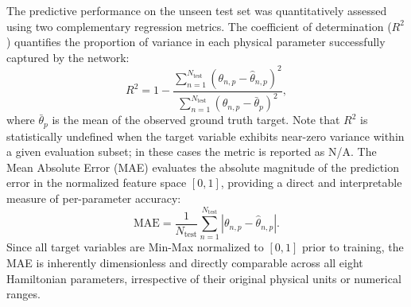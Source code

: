 \documentclass[a4paper,fleqn]{cas-sc}
\begin{document}
The predictive performance on the unseen test set 
was quantitatively assessed using two complementary 
regression metrics. The coefficient of determination 
($R^2$) quantifies the proportion of variance in 
each physical parameter successfully captured by 
the network:
%
\begin{equation}\label{eq:R2}
R^2 = 1 - \frac{\sum_{n=1}^{N_{\text{test}}} 
\left(\theta_{n,p} - \hat{\theta}_{n,p}\right)^2}
{\sum_{n=1}^{N_{\text{test}}} 
\left(\theta_{n,p} - \bar{\theta}_p\right)^2},
\end{equation}
%
where $\bar{\theta}_p$ is the mean of the observed 
ground truth target. Note that $R^2$ is statistically 
undefined when the target variable exhibits near-zero 
variance within a given evaluation subset; in these 
cases the metric is reported as N/A. The Mean Absolute 
Error (MAE) evaluates the absolute magnitude of the 
prediction error in the normalized feature space 
$[0,1]$, providing a direct and interpretable measure 
of per-parameter accuracy:
%
\begin{equation}\label{eq:MAE}
\text{MAE} = \frac{1}{N_{\text{test}}} 
\sum_{n=1}^{N_{\text{test}}} 
\left|\theta_{n,p} - \hat{\theta}_{n,p}\right|.
\end{equation}
%
Since all target variables are Min-Max normalized 
to $[0,1]$ prior to training, the MAE is inherently 
dimensionless and directly comparable across all 
eight Hamiltonian parameters, irrespective of their 
original physical units or numerical ranges.
\end{document}
